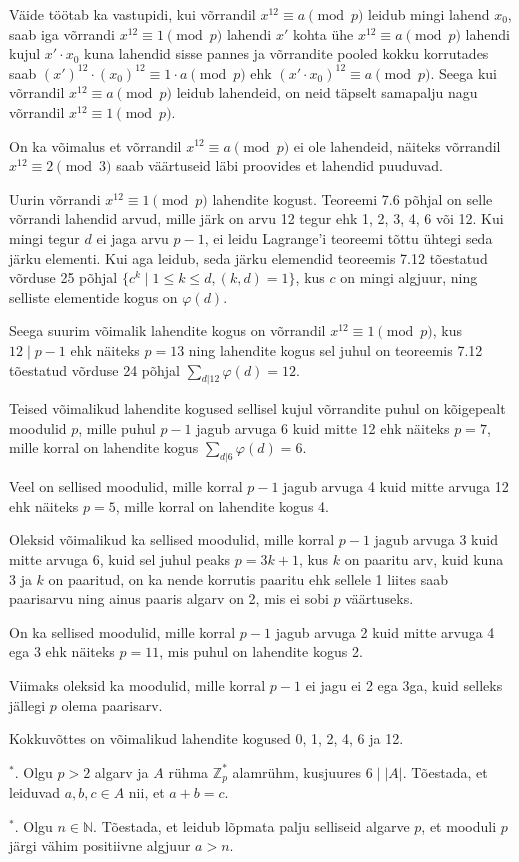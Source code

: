\documentclass[a4paper, 10pt]{article}
\newcommand{\Z}{\mathbb{Z}}
\newcommand{\N}{\mathbb{N}}
\begin{document}
Väide töötab ka vastupidi, kui võrrandil $x^{12}\equiv a\pmod p$ leidub mingi lahend $x_0$, saab iga võrrandi $x^{12}\equiv1\pmod p$ lahendi $x'$ kohta ühe $x^{12}\equiv a\pmod p$ lahendi kujul $x'\cdot x_0$ kuna lahendid sisse pannes ja võrrandite pooled kokku korrutades saab $(x')^{12}\cdot (x_0)^{12}\equiv 1\cdot a\pmod p$ ehk $(x'\cdot x_0)^{12}\equiv a\pmod p$. Seega kui võrrandil $x^{12}\equiv a\pmod p$ leidub lahendeid, on neid täpselt samapalju nagu võrrandil $x^{12}\equiv 1\pmod p$.

On ka võimalus et võrrandil $x^{12}\equiv a\pmod p$ ei ole lahendeid, näiteks võrrandil $x^{12}\equiv2\pmod 3$ saab väärtuseid läbi proovides et lahendid puuduvad.

Uurin võrrandi $x^{12}\equiv1\pmod p$ lahendite kogust. Teoreemi 7.6 põhjal on selle võrrandi lahendid arvud, mille järk on arvu 12 tegur ehk 1, 2, 3, 4, 6 või 12. Kui mingi tegur $d$ ei jaga arvu $p-1$, ei leidu Lagrange'i teoreemi tõttu ühtegi seda järku elementi. Kui aga leidub, seda järku elemendid teoreemis 7.12 tõestatud võrduse 25 põhjal $\{c^k\mid 1\leq k\leq d, (k,d)=1\}$, kus $c$ on mingi algjuur, ning selliste elementide kogus on $\varphi(d)$.

Seega suurim võimalik lahendite kogus on võrrandil $x^{12}\equiv1\pmod p$, kus $12\mid p-1$ ehk näiteks $p=13$ ning lahendite kogus sel juhul on teoreemis 7.12 tõestatud võrduse 24 põhjal $\sum_{d|12}\varphi(d)=12$.

Teised võimalikud lahendite kogused sellisel kujul võrrandite puhul on kõigepealt moodulid $p$, mille puhul $p-1$ jagub arvuga 6 kuid mitte 12 ehk näiteks $p=7$, mille korral on lahendite kogus $\sum_{d|6}\varphi(d)=6$.

Veel on sellised moodulid, mille korral $p-1$ jagub arvuga 4 kuid mitte arvuga 12 ehk näiteks $p=5$, mille korral on lahendite kogus 4.

Oleksid võimalikud ka sellised moodulid, mille korral $p-1$ jagub arvuga 3 kuid mitte arvuga 6, kuid sel juhul peaks $p=3k+1$, kus $k$ on paaritu arv, kuid kuna 3 ja $k$ on paaritud, on ka nende korrutis paaritu ehk sellele 1 liites saab paarisarvu ning ainus paaris algarv on 2, mis ei sobi $p$ väärtuseks.

On ka sellised moodulid, mille korral $p-1$ jagub arvuga 2 kuid mitte arvuga 4 ega 3 ehk näiteks $p=11$, mis puhul on lahendite kogus 2.

Viimaks oleksid ka moodulid, mille korral $p-1$ ei jagu ei 2 ega 3ga, kuid selleks jällegi $p$ olema paarisarv.

Kokkuvõttes on võimalikud lahendite kogused 0, 1, 2, 4, 6 ja 12.
\bigskip

${^*}$. Olgu $p>2$ algarv ja $A$ rühma $\Z_p^*$ alamrühm, kusjuures $6\mid |A|$. Tõestada, et leiduvad $a,b,c\in A$ nii, et $a+b=c$. 

\bigskip

${^{*}}$. Olgu $n\in\N$. Tõestada, et leidub lõpmata palju selliseid algarve $p$, et mooduli $p$ järgi vähim positiivne algjuur $a>n$.
\end{document}
